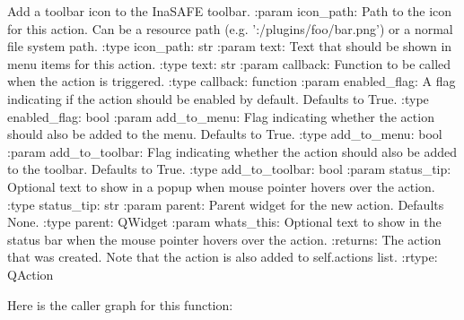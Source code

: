 \begin{DoxyVerb}Add a toolbar icon to the InaSAFE toolbar.
:param icon_path: Path to the icon for this action. Can be a resource
    path (e.g. ':/plugins/foo/bar.png') or a normal file system path.
:type icon_path: str
:param text: Text that should be shown in menu items for this action.
:type text: str
:param callback: Function to be called when the action is triggered.
:type callback: function
:param enabled_flag: A flag indicating if the action should be enabled
    by default. Defaults to True.
:type enabled_flag: bool
:param add_to_menu: Flag indicating whether the action should also
    be added to the menu. Defaults to True.
:type add_to_menu: bool
:param add_to_toolbar: Flag indicating whether the action should also
    be added to the toolbar. Defaults to True.
:type add_to_toolbar: bool
:param status_tip: Optional text to show in a popup when mouse pointer
    hovers over the action.
:type status_tip: str
:param parent: Parent widget for the new action. Defaults None.
:type parent: QWidget
:param whats_this: Optional text to show in the status bar when the
    mouse pointer hovers over the action.
:returns: The action that was created. Note that the action is also
    added to self.actions list.
:rtype: QAction
\end{DoxyVerb}
 Here is the caller graph for this function\+:
\nopagebreak
